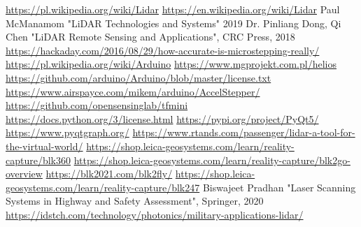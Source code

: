 \documentclass{thesis}
\begin{document}

\newpage
\tableofcontents
\newpage









\begin{thebibliography}{10}
 \url{https://pl.wikipedia.org/wiki/Lidar}
 \url{https://en.wikipedia.org/wiki/Lidar}
 Paul McManamom "LiDAR Technologies and Systems" 2019
 Dr. Pinliang Dong, Qi Chen "LiDAR Remote Sensing and Applications", CRC Press, 2018
 \url{https://hackaday.com/2016/08/29/how-accurate-is-microstepping-really/}
 \url{https://pl.wikipedia.org/wiki/Arduino}
 \url{https://www.mgprojekt.com.pl/helios}
 \url{https://github.com/arduino/Arduino/blob/master/license.txt}
 \url{https://www.airspayce.com/mikem/arduino/AccelStepper/}
 \url{https://github.com/opensensinglab/tfmini}
 \url{https://docs.python.org/3/license.html}
 \url{https://pypi.org/project/PyQt5/}
 \url{https://www.pyqtgraph.org/}
 \url{https://www.rtands.com/passenger/lidar-a-tool-for-the-virtual-world/}
 \url{https://shop.leica-geosystems.com/learn/reality-capture/blk360}
 \url{https://shop.leica-geosystems.com/learn/reality-capture/blk2go-overview}
 \url{https://blk2021.com/blk2fly/}
 \url{https://shop.leica-geosystems.com/learn/reality-capture/blk247}
 Biswajeet Pradhan "Laser Scanning Systems in Highway and Safety Assessment", Springer, 2020
 \url{https://idstch.com/technology/photonics/military-applications-lidar/}

\end{thebibliography}
\newpage
\listoffigures
\end{document}

